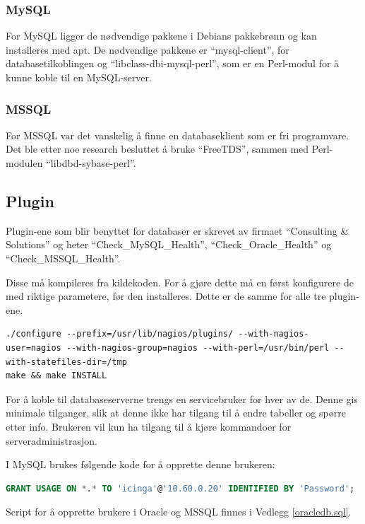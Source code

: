 \subsubsection{MySQL}
For MySQL ligger de nødvendige pakkene i Debians pakkebrønn og kan installeres med apt. De nødvendige pakkene er ``mysql-client'', for databasetilkoblingen og ``libclass-dbi-mysql-perl'', som er en Perl-modul for å kunne koble til en MySQL-server.

\subsubsection{MSSQL}
For MSSQL var det vanskelig å finne en databaseklient som er fri programvare. Det ble etter noe research besluttet å bruke ``FreeTDS''\cite{freetds}, sammen med Perl-modulen ``libdbd-sybase-perl''.

\subsection{Plugin}
Plugin-ene som blir benyttet for databaser er skrevet av firmaet ``Consulting \& Solutions'' og heter ``Check\_MySQL\_Health'', ``Check\_Oracle\_Health'' og ``Check\_MSSQL\_Health''\cite{consol}.

Disse må kompileres fra kildekoden. For å gjøre dette må en først konfigurere de med riktige parametere, før den installeres. Dette er de samme for alle tre plugin-ene.

\begin{lstlisting}[style=example]
./configure --prefix=/usr/lib/nagios/plugins/ --with-nagios-user=nagios --with-nagios-group=nagios --with-perl=/usr/bin/perl --with-statefiles-dir=/tmp
make && make INSTALL
\end{lstlisting}

For å koble til databaseserverne trengs en servicebruker for hver av de. Denne gis minimale tilganger, slik at denne ikke har tilgang til å endre tabeller og spørre etter info. Brukeren vil kun ha tilgang til å kjøre kommandoer for serveradministrasjon\cite{mysqlpriv}.

I MySQL brukes følgende kode for å opprette denne brukeren:
\begin{lstlisting}[language=SQL,style=example]
GRANT USAGE ON *.* TO 'icinga'@'10.60.0.20' IDENTIFIED BY 'Password';
\end{lstlisting}

Script for å opprette brukere i Oracle og MSSQL finnes i Vedlegg \ref{oracledb.sql}.

